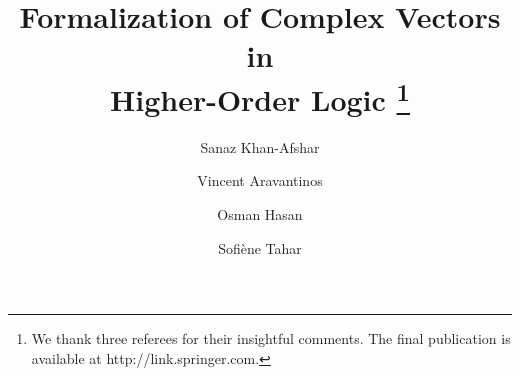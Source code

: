 \documentclass{llncs}
\begin{document}
\pagestyle{empty}

\mainmatter


\title{Formalization of Complex Vectors in \\
Higher-Order Logic \thanks{We thank three referees for their insightful comments.
The final publication is available at http://link.springer.com.}}


\author{Sanaz Khan-Afshar  \and Vincent Aravantinos \and Osman Hasan \and Sofi\`{e}ne Tahar}
 \maketitle

\newcommand\indnt{\phantom{\ensuremath{\mathtt{\vdash\ }}}}
\newcommand\indntt{\indnt\indnt}
\newcommand\indnttt{\indntt\indnt}
\newcommand\C{\ensuremath{complex}\xspace}
\newcommand\R{\ensuremath{real}\xspace}
\newcommand\Cthree{\ensuremath{\mathtt{complex^3}}\xspace}
\newcommand\CN{\ensuremath{\mathtt{{complex^N}}}\xspace}
\newcommand\cfun{\ensuremath{\mathtt{cfun}}\xspace}
\newcommand\dst{\ensuremath{\mathtt{dest\_cart}}\xspace}
\newcommand\mk{\ensuremath{\mathtt{mk\_cart}}\xspace}
\newcommand\copofmat{cop\_of\_cmatrix\xspace}
\newcommand\cmatofop{cmatrix\_of\_cop\xspace}

\def\hol#1{$\mathtt{#1}$}
\def\vvec#1{\vec{#1}\,}
\def\rr{\vec{r}}
\def\vv{\vec{v}}
\def\ne{n_{\rm e}}
\def\ni{n_{\rm i}}
\def\no{n_{\rm 0}}
\def\me{m_{\rm e}}
\def\mi{m_{\rm i}}
\def\Te{T_{\rm e}}
\def\Ti{T_{\rm i}}
\def\Leftrightarrowdef{\Leftrightarrow}
\def\isincidentbasis{is\_incident\_basis\ }
\def\Xofbasis{x1\_of\_basis\ }
\def\Yofbasis{x2\_of\_basis\ }
\def\Zofbasis{x3\_of\_basis\ }

\def\emf{emf}
\let\odot=\cdot
\def\Lambda#1{\lambda #1\qdot}
\def\wofwave{\omega\_of\_w\ }
\def\eofwave{e\_of\_w\ }
\def\Exists#1{\exists #1\qdot}
\def\mapt{map\_triple\ }
\def\hofwave{h\_of\_w\ }
\def\planewave{plane\_wave\ }
\def\eqdef{=}
\def\NS{\negthinspace\negthinspace}
\def\isplanewaveatitf{is\_plane\_wave\_at\_interface\ }
\def\isplanewave{is\_plane\_wave\ }
\def\isvaliditf{is\_valid\_interface\ }
\def\isinplan{is\_in\_plane\ }
\def\kofwave{k\_of\_w\ }
\def\boundaryconditions{boundary\_conditions\ }
\def\Normalofplan{norm\_of\_plane}
\def\normalofplan{\Normalofplan\ }
\def\forceindent{\ \ }
\def\vdashdef{\vdash}
\def\qdot{.\ }
\def\Forall#1{\forall #1\qdot}
\def\isposonbasis{is\_positive\_orthonormal\_basis\ }
\def\planofitf{plane\_of\_interface\ }
\def\aresymetric{are\_sym\_wrt\ }
\def\vectorsine{vector\_sine\ }
\def\vecnorm#1{\parallel\negthinspace #1\negthinspace\parallel}
\def\temode{te\_mode\ }
\def\tmmode{tm\_mode\ }
\def\boundaryconds{boundary\_conditions\ }
\def\eofemf{e\_of\_emf\ }
\def\hofemf{h\_of\_emf\ }
\end{document}
